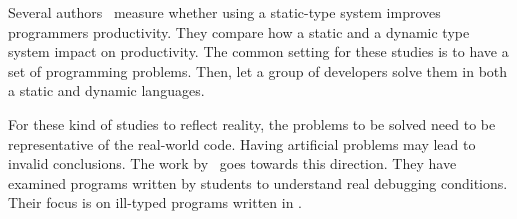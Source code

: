 Several authors~\cite{stuchlikStaticVsDynamic2011,mayerEmpiricalStudyInfluence2012,harlinImpactUsingStaticType2017} measure whether using a static-type system improves programmers productivity.
They compare how a static and a dynamic type system impact on productivity.
The common setting for these studies is to have a set of programming problems.
Then, let a group of developers solve them in both a static and dynamic languages.

For these kind of studies to reflect reality, the problems to be solved need to be representative of the real-world code.
Having artificial problems may lead to invalid conclusions.
The work by~\cite{wuHowTypeErrors2017,wuLearningUserFriendly2017} goes towards this direction. 
They have examined programs written by students to understand real debugging conditions. 
Their focus is on ill-typed programs written in \haskell{}.

